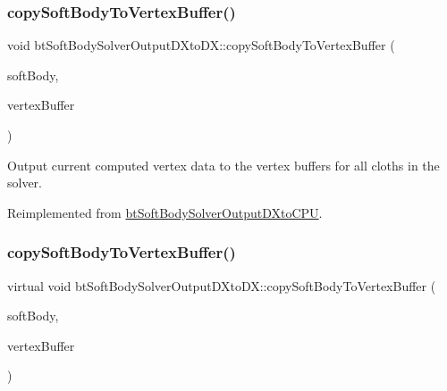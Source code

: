 \subsubsection{\texorpdfstring{copy\+Soft\+Body\+To\+Vertex\+Buffer()}{copySoftBodyToVertexBuffer()}\hspace{0.1cm}{\footnotesize\ttfamily [1/2]}}
{\footnotesize\ttfamily void bt\+Soft\+Body\+Solver\+Output\+D\+Xto\+D\+X\+::copy\+Soft\+Body\+To\+Vertex\+Buffer (\begin{DoxyParamCaption}\item[{const \hyperlink{classbtSoftBody}{bt\+Soft\+Body} $\ast$const}]{soft\+Body,  }\item[{\hyperlink{classbtVertexBufferDescriptor}{bt\+Vertex\+Buffer\+Descriptor} $\ast$}]{vertex\+Buffer }\end{DoxyParamCaption})\hspace{0.3cm}{\ttfamily [virtual]}}

Output current computed vertex data to the vertex buffers for all cloths in the solver. 

Reimplemented from \hyperlink{classbtSoftBodySolverOutputDXtoCPU_a0106bf90eec43326254607cab4a10478}{bt\+Soft\+Body\+Solver\+Output\+D\+Xto\+C\+PU}.

\mbox{\label{classbtSoftBodySolverOutputDXtoDX_aac21bd05d5f1a2afb9ee855554ac13f1}} 
\subsubsection{\texorpdfstring{copy\+Soft\+Body\+To\+Vertex\+Buffer()}{copySoftBodyToVertexBuffer()}\hspace{0.1cm}{\footnotesize\ttfamily [2/2]}}
{\footnotesize\ttfamily virtual void bt\+Soft\+Body\+Solver\+Output\+D\+Xto\+D\+X\+::copy\+Soft\+Body\+To\+Vertex\+Buffer (\begin{DoxyParamCaption}\item[{const \hyperlink{classbtSoftBody}{bt\+Soft\+Body} $\ast$const}]{soft\+Body,  }\item[{\hyperlink{classbtVertexBufferDescriptor}{bt\+Vertex\+Buffer\+Descriptor} $\ast$}]{vertex\+Buffer }\end{DoxyParamCaption})\hspace{0.3cm}{\ttfamily [virtual]}}


